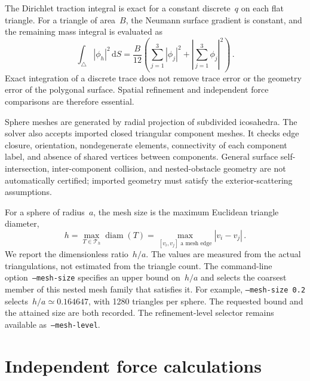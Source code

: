 \documentclass[11pt,a4paper]{article}
\numberwithin{equation}{section}
\newcommand{\dd}{\,\mathrm d}
\begin{document}
The Dirichlet traction integral is exact for a constant discrete~$q$ on each flat triangle. For a triangle of area~$B$, the Neumann surface gradient is constant, and the remaining mass integral is evaluated as
\begin{equation}
 \int_\triangle|\phi_h|^2\dd S
  =\frac B{12}\left(\sum_{j=1}^3|\phi_j|^2+
                         \left|\sum_{j=1}^3\phi_j\right|^2\right)\,.
\end{equation}
Exact integration of a discrete trace does not remove trace error or the geometry error of the polygonal surface. Spatial refinement and independent force comparisons are therefore essential.

Sphere meshes are generated by radial projection of subdivided icosahedra. The solver also accepts imported closed triangular component meshes. It checks edge closure, orientation, nondegenerate elements, connectivity of each component label, and absence of shared vertices between components. General surface self-intersection, inter-component collision, and nested-obstacle geometry are not automatically certified; imported geometry must satisfy the exterior-scattering assumptions.

For a sphere of radius~$a$, the mesh size is the maximum Euclidean triangle diameter,
\begin{equation}\label{eq:mesh-size}
 h=\max_{T\in\mathcal T_h}\operatorname{diam}(T)
   =\max_{[v_i,v_j]\text{ a mesh edge}}|v_i-v_j|\,.
\end{equation}
We report the dimensionless ratio~$h/a$. The values are measured from the actual triangulations, not estimated from the triangle count. The command-line option~\texttt{--mesh-size} specifies an upper bound on~$h/a$ and selects the coarsest member of this nested mesh family that satisfies it. For example, \texttt{--mesh-size 0.2} selects~$h/a\simeq0.164647$, with 1280 triangles per sphere. The requested bound and the attained size are both recorded. The refinement-level selector remains available as~\texttt{--mesh-level}.

\section{Independent force calculations}
\end{document}
